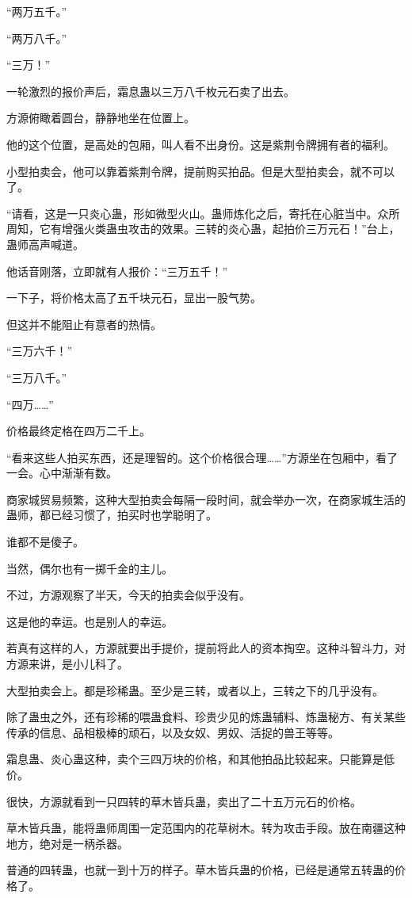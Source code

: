 \begin{this_body}
“两万五千。”

“两万八千。”

“三万！”

一轮激烈的报价声后，霜息蛊以三万八千枚元石卖了出去。

方源俯瞰着圆台，静静地坐在位置上。

他的这个位置，是高处的包厢，叫人看不出身份。这是紫荆令牌拥有者的福利。

小型拍卖会，他可以靠着紫荆令牌，提前购买拍品。但是大型拍卖会，就不可以了。

“请看，这是一只炎心蛊，形如微型火山。蛊师炼化之后，寄托在心脏当中。众所周知，它有增强火类蛊虫攻击的效果。三转的炎心蛊，起拍价三万元石！”台上，蛊师高声喊道。

他话音刚落，立即就有人报价：“三万五千！”

一下子，将价格太高了五千块元石，显出一股气势。

但这并不能阻止有意者的热情。

“三万六千！”

“三万八千。”

“四万……”

价格最终定格在四万二千上。

“看来这些人拍买东西，还是理智的。这个价格很合理……”方源坐在包厢中，看了一会。心中渐渐有数。

商家城贸易频繁，这种大型拍卖会每隔一段时间，就会举办一次，在商家城生活的蛊师，都已经习惯了，拍买时也学聪明了。

谁都不是傻子。

当然，偶尔也有一掷千金的主儿。

不过，方源观察了半天，今天的拍卖会似乎没有。

这是他的幸运。也是别人的幸运。

若真有这样的人，方源就要出手提价，提前将此人的资本掏空。这种斗智斗力，对方源来讲，是小儿科了。

大型拍卖会上。都是珍稀蛊。至少是三转，或者以上，三转之下的几乎没有。

除了蛊虫之外，还有珍稀的喂蛊食料、珍贵少见的炼蛊辅料、炼蛊秘方、有关某些传承的信息、品相极棒的顽石，以及女奴、男奴、活捉的兽王等等。

霜息蛊、炎心蛊这种，卖个三四万块的价格，和其他拍品比较起来。只能算是低价。

很快，方源就看到一只四转的草木皆兵蛊，卖出了二十五万元石的价格。

草木皆兵蛊，能将蛊师周围一定范围内的花草树木。转为攻击手段。放在南疆这种地方，绝对是一柄杀器。

普通的四转蛊，也就一到十万的样子。草木皆兵蛊的价格，已经是通常五转蛊的价格了。


\end{this_body}
